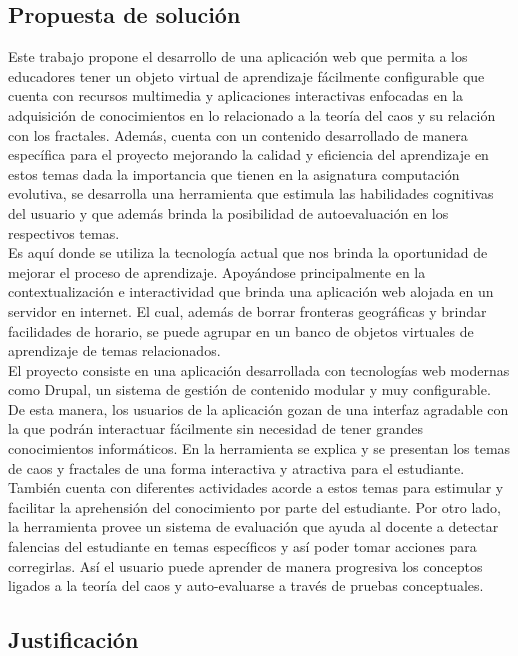 \documentclass[letterpaper, 11pt, oneside]{article}
\theoremstyle{definition}
\theoremstyle{remark}
\begin{document}
\clearpage
\subsection{Propuesta de solución}
Este trabajo propone el desarrollo de una aplicación web que permita a los educadores tener un objeto virtual de aprendizaje fácilmente configurable que cuenta con recursos multimedia y aplicaciones interactivas  enfocadas en la adquisición de conocimientos en lo relacionado a la teoría del caos y su relación con los fractales. Además, cuenta con un contenido desarrollado de manera específica para el proyecto mejorando la calidad y eficiencia del aprendizaje en estos temas dada la importancia que tienen en la asignatura computación evolutiva, se desarrolla una herramienta que estimula las habilidades cognitivas del usuario y que además brinda la posibilidad de autoevaluación en los respectivos temas. \\

Es aquí donde se utiliza la tecnología actual que nos brinda la oportunidad de mejorar el proceso de aprendizaje. Apoyándose principalmente en la contextualización e interactividad que brinda una aplicación web alojada en un servidor en internet. El cual, además de borrar fronteras geográficas y brindar facilidades de horario, se puede agrupar en un banco de objetos virtuales de aprendizaje de temas relacionados. \\

El proyecto consiste en una aplicación desarrollada con tecnologías web modernas como Drupal, un sistema de gestión de contenido modular y muy configurable. De esta manera, los usuarios de la aplicación gozan de una interfaz agradable con la que podrán interactuar fácilmente sin necesidad de tener grandes conocimientos informáticos. En la herramienta se explica y se presentan los temas de caos y fractales de una forma interactiva y atractiva para el estudiante. También cuenta con diferentes actividades acorde a estos temas para estimular y facilitar la aprehensión del conocimiento por parte del estudiante. Por otro lado, la herramienta provee un sistema de evaluación que ayuda al docente a detectar falencias del estudiante en temas específicos y así poder tomar acciones para corregirlas. Así el usuario puede aprender de manera progresiva los conceptos ligados a la teoría del caos y auto-evaluarse a través de pruebas conceptuales. \\
\clearpage

\subsection{Justificación}
  
\end{document}

